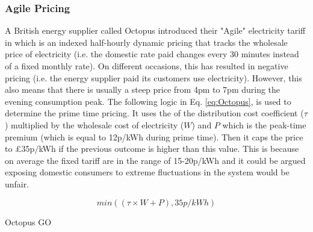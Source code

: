 \documentclass[energies,article,submit,moreauthors,pdftex]{Definitions/mdpi}
\begin{document}


\subsubsection{Agile Pricing}
A British energy supplier called Octopus \cite{AgileEnergy} introduced their "Agile" electricity tariff in which is an indexed half-hourly dynamic pricing that tracks the wholesale price of electricity (i.e. the domestic rate paid changes every 30 minutes instead of a fixed monthly rate). On different occasions, this has resulted in negative pricing (i.e. the energy supplier paid its customers use electricity). However, this also means that there is usually a steep price from 4pm to 7pm during the evening consumption peak. The following logic in Eq. \ref{eq:Octopus}, is used to determine the prime time pricing. It uses the of the distribution cost coefficient ($\tau$) multiplied by the wholesale cost of electricity ($W$) and $P$ which is the peak-time premium (which is equal to 12p/kWh during prime time). Then it caps the price to £35p/kWh if the previous outcome is higher than this value. This is because on average the fixed tariff are in the range of 15-20p/kWh and it could be argued exposing domestic consumers to extreme fluctuations in the system would be unfair.

\begin{equation}\label{eq:Octopus}
min((\tau \times W + P), 35p/kWh)
\end{equation}

Octopus GO
\end{document}
